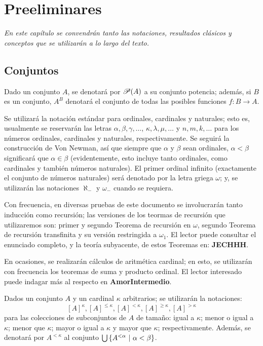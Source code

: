\setcounter{chapter}{-1}
\chapter{Preeliminares}

\emph{\small En este capítulo se convendrán tanto las notaciones, resultados clásicos y conceptos que se utilizarán a lo largo del texto.}

\section{Conjuntos}

Dado un conjunto $A$, se denotará por $\mathscr{P}(A)$ a su conjunto potencia; además, si $B$ es un conjunto, $A^B$ denotará el conjunto de todas las posibles funciones $f:B \to A$.

Se utilizará la notación estándar para ordinales, cardinales y naturales; esto es, usualmente se reservarán las letras $\alpha,\beta,\gamma,\dots$, $\kappa,\lambda,\mu,\dots$ y $n,m,k,\dots$ para los números ordinales, cardinales y naturales, respectivamente. Se seguirá la construcción de Von Newman, así que siempre que $\alpha$ y $\beta$ sean ordinales, $\alpha<\beta$ significará que $\alpha \in \beta$ (evidentemente, esto incluye tanto ordinales, como cardinales y también números naturales). El primer ordinal infinito (exactamente el conjunto de números naturales) será denotado por la letra griega $\omega$; y, se utilizarán las notaciones $\aleph_-$ y $\omega_-$ cuando se requiera.

Con frecuencia, en diversas pruebas de este documento se involucrarán tanto inducción como recursión; las versiones de los teormas de recursión que utilizaremos son: primer y segundo Teorema de recursión en $\omega$, segundo Teorema de recursión transfinita y su versión restringida a $\omega_1$. El lector puede consultar el enunciado completo, y la teoría subyacente, de estos Teoremas en: \textbf{JECHHH}.

En ocasiones, se realizarán cálculos de aritmética cardinal; en esto, se utilizarán con frecuencia los teoremas de suma y producto ordinal. El lector interesado puede indagar más al respecto en \textbf{AmorIntermedio}.

Dados un conjunto $A$ y un cardinal $\kappa$ arbitrarios; se utilizarán la notaciones:
\[[A]^\kappa,[A]^{\leq \kappa},[A]^{< \kappa},[A]^{\geq \kappa},[A]^{> \kappa}\]
para las colecciones de subconjuntos de $A$ de tamaño: igual a $\kappa$; menor o igual a $\kappa$; menor que $\kappa$; mayor o igual a $\kappa$ y mayor que $\kappa$; respectivamente. Además, se denotará por $A^{<\kappa}$ al conjunto $\mbox{$\bigcup$}\, \{A^{<\alpha} \text{ $|$ } \alpha < \beta\}$.


